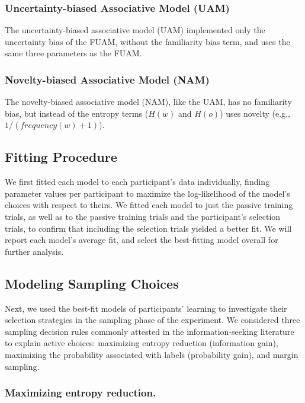 \documentclass[10pt, letterpaper]{article}
\begin{document}
\subsubsection{Uncertainty-biased Associative Model
(UAM)}\label{uncertainty-biased-associative-model-uam}

The uncertainty-biased associative model (UAM) implemented only the
uncertainty bias of the FUAM, without the familiarity bias term, and
uses the same three parameters as the FUAM.

\subsubsection{Novelty-biased Associative Model
(NAM)}\label{novelty-biased-associative-model-nam}

The novelty-biased associative model (NAM), like the UAM, has no
familiarity bias, but instead of the entropy terms (\(H(w)\) and
\(H(o)\)) uses novelty (e.g., \(1/(frequency(w)+1)\)).

\subsection{Fitting Procedure}\label{fitting-procedure}

We first fitted each model to each participant's data individually,
finding parameter values per participant to maximize the log-likelihood
of the model's choices with respect to theirs. We fitted each model to
just the passive training trials, as well as to the passive training
trials and the participant's selection trials, to confirm that including
the selection trials yielded a better fit. We will report each model's
average fit, and select the best-fitting model overall for further
analysis.

\subsection{Modeling Sampling Choices}\label{modeling-sampling-choices}

Next, we used the best-fit models of participants' learning to
investigate their selection strategies in the sampling phase of the
experiment. We considered three sampling decision rules commonly
attested in the information-seeking literature to explain active
choices: maximizing entropy reduction (information gain), maximizing the
probability associated with labels (probability gain), and margin
sampling.

\subsubsection{Maximizing entropy
reduction.}\label{maximizing-entropy-reduction.}
\end{document}
